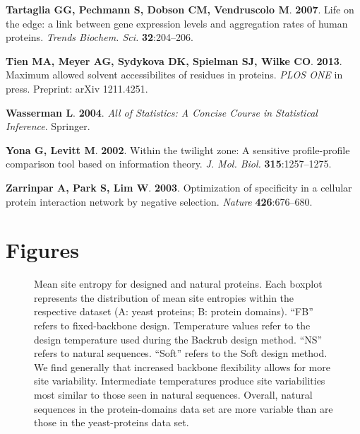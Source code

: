 \documentclass[12pt]{article}
\begin{document}
\begin{thebibliography}{36}
\textbf{Tartaglia GG, Pechmann S, Dobson CM, Vendruscolo M}. \textbf{2007}.
\newblock Life on the edge: a link between gene expression levels and
  aggregation rates of human proteins.
\newblock \emph{Trends Biochem. Sci.} \textbf{32}:204--206.

\textbf{Tien MA, Meyer AG, Sydykova DK, Spielman SJ, Wilke CO}. \textbf{2013}.
\newblock Maximum allowed solvent accessibilites of residues in proteins.
\newblock \emph{PLOS ONE} in press.
\newblock Preprint: arXiv 1211.4251.

\textbf{Wasserman L}. \textbf{2004}.
\newblock \emph{All of Statistics: A Concise Course in Statistical Inference}.
\newblock Springer.

\textbf{Yona G, Levitt M}. \textbf{2002}.
\newblock Within the twilight zone: A sensitive profile-profile comparison tool
  based on information theory.
\newblock \emph{J. Mol. Biol.} \textbf{315}:1257--1275.

\textbf{Zarrinpar A, Park S, Lim W}. \textbf{2003}.
\newblock Optimization of specificity in a cellular protein interaction network
  by negative selection.
\newblock \emph{Nature} \textbf{426}:676--680.

\end{thebibliography}

\cleardoublepage

\section*{Figures}

\begin{figure}[H]
\caption{Mean site entropy for designed and natural proteins. Each boxplot represents the distribution of mean site entropies within the respective dataset (A: yeast proteins; B: protein domains). ``FB'' refers to fixed-backbone design. Temperature values refer to the design temperature used during the Backrub design method. ``NS'' refers to natural sequences. ``Soft'' refers to the Soft design method. We find generally that increased backbone flexibility allows for more site variability. Intermediate temperatures produce site variabilities most similar to those seen in natural sequences. Overall, natural sequences in the protein-domains data set are more variable than are those in the yeast-proteins data set.}
\label{MeanEntropyComparison}
\end{figure}
\end{document}

